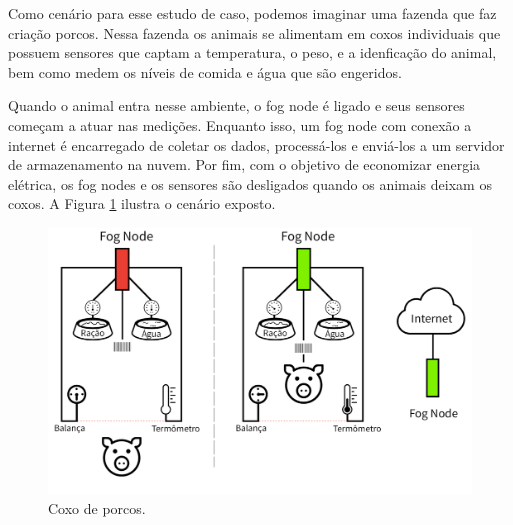 Como cenário para esse estudo de caso, podemos imaginar uma fazenda que faz criação porcos.
Nessa fazenda os animais se alimentam em coxos individuais que possuem sensores que captam a temperatura, o peso, e a idenficação do animal, bem como medem os níveis de comida e água
que são engeridos.

Quando o animal entra nesse ambiente, o fog node é ligado e seus sensores começam a atuar nas medições.
Enquanto isso, um fog node com conexão a internet é encarregado de coletar os dados, processá-los e enviá-los a um servidor de armazenamento na nuvem.
Por fim, com o objetivo de economizar energia elétrica, os fog nodes e os sensores são desligados quando os animais deixam os coxos.
A Figura \ref{fig:fig17} ilustra o cenário exposto.

\begin{figure}[H]
    \centering\includegraphics[width=.8\textwidth]{fig17.png} 
    \caption%
    {\label{fig:fig17} Coxo de porcos.}
\end{figure}